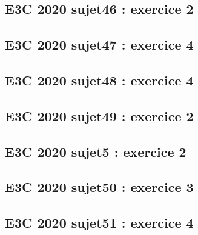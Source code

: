 \documentclass[lang=fr,edition=teacher,layout=sheet]{mxbook}
\begin{document}
\begingroup\endgroup
\par\bigskip
{}\subsection*{E3C 2020 sujet46 : exercice 2}
\begingroup\endgroup
\par\bigskip
{}\subsection*{E3C 2020 sujet47 : exercice 4}
\begingroup\endgroup
\par\bigskip
{}\subsection*{E3C 2020 sujet48 : exercice 4}
\begingroup\endgroup
\par\bigskip
{}\subsection*{E3C 2020 sujet49 : exercice 2}
\begingroup\endgroup
\par\bigskip
{}\subsection*{E3C 2020 sujet5 : exercice 2}
\begingroup\endgroup
\par\bigskip
{}\subsection*{E3C 2020 sujet50 : exercice 3}
\begingroup\endgroup
\par\bigskip
{}\subsection*{E3C 2020 sujet51 : exercice 4}
\begingroup\endgroup
\end{document}
